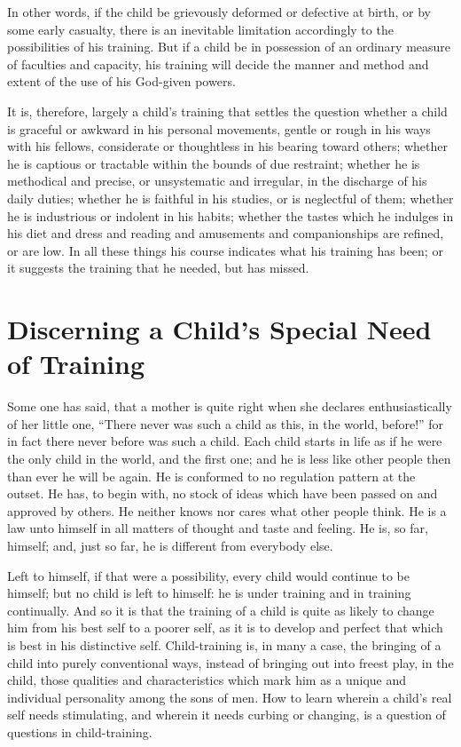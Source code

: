 \documentclass[
]{book}
\begin{document}
In other words, if the child be grievously deformed or defective at birth, or by some early casualty, there is an inevitable limitation accordingly to the possibilities of his training. But if a child be in possession of an ordinary measure of faculties and capacity, his training will decide the manner and method and extent of the use of his God-given powers.

It is, therefore, largely a child's training that settles the question whether a child is graceful or awkward in his personal movements, gentle or rough in his ways with his fellows, considerate or thoughtless in his bearing toward others; whether he is captious or tractable within the bounds of due restraint; whether he is methodical and precise, or unsystematic and irregular, in the discharge of his daily duties; whether he is faithful in his studies, or is neglectful of them; whether he is industrious or indolent in his habits; whether the tastes which he indulges in his diet and dress and reading and amusements and companionships are refined, or are low. In all these things his course indicates what his training has been; or it suggests the training that he needed, but has missed.

\hypertarget{discerning-a-childs-special-need-of-training}{%
\chapter{Discerning a Child's Special Need of Training}\label{discerning-a-childs-special-need-of-training}}

Some one has said, that a mother is quite right when she declares enthusiastically of her little one, ``There never was such a child as this, in the world, before!'' for in fact there never before was such a child. Each child starts in life as if he were the only child in the world, and the first one; and he is less like other people then than ever he will be again. He is conformed to no regulation pattern at the outset. He has, to begin with, no stock of ideas which have been passed on and approved by others. He neither knows nor cares what other people think. He is a law unto himself in all matters of thought and taste and feeling. He is, so far, himself; and, just so far, he is different from everybody else.

Left to himself, if that were a possibility, every child would continue to be himself; but no child is left to himself: he is under training and in training continually. And so it is that the training of a child is quite as likely to change him from his best self to a poorer self, as it is to develop and perfect that which is best in his distinctive self. Child-training is, in many a case, the bringing of a child into purely conventional ways, instead of bringing out into freest play, in the child, those qualities and characteristics which mark him as a unique and individual personality among the sons of men. How to learn wherein a child's real self needs stimulating, and wherein it needs curbing or changing, is a question of questions in child-training.
\end{document}
